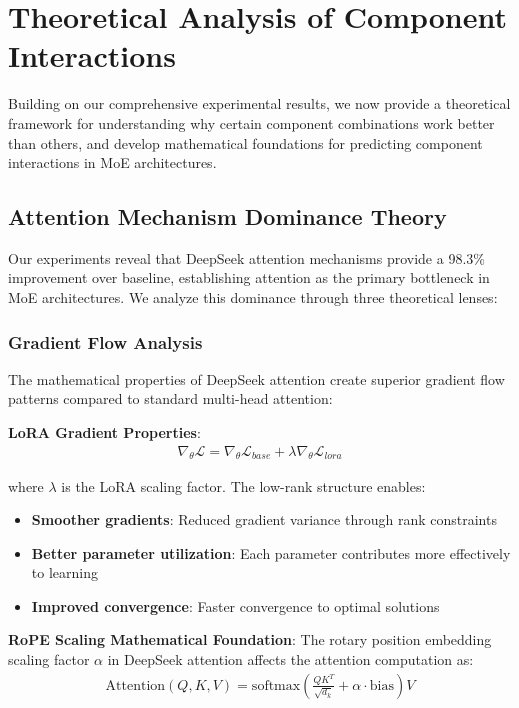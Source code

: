 \documentclass[11pt,a4paper]{article}
\begin{document}
\section{Theoretical Analysis of Component Interactions}

Building on our comprehensive experimental results, we now provide a theoretical framework for understanding why certain component combinations work better than others, and develop mathematical foundations for predicting component interactions in MoE architectures.

\subsection{Attention Mechanism Dominance Theory}

Our experiments reveal that DeepSeek attention mechanisms provide a 98.3\% improvement over baseline, establishing attention as the primary bottleneck in MoE architectures. We analyze this dominance through three theoretical lenses:

\subsubsection{Gradient Flow Analysis}

The mathematical properties of DeepSeek attention create superior gradient flow patterns compared to standard multi-head attention:

\textbf{LoRA Gradient Properties}:
\begin{align}
\nabla_\theta \mathcal{L} = \nabla_\theta \mathcal{L}_{base} + \lambda \nabla_\theta \mathcal{L}_{lora}
\end{align}

where $\lambda$ is the LoRA scaling factor. The low-rank structure enables:
\begin{itemize}
    \item \textbf{Smoother gradients}: Reduced gradient variance through rank constraints
    \item \textbf{Better parameter utilization}: Each parameter contributes more effectively to learning
    \item \textbf{Improved convergence}: Faster convergence to optimal solutions
\end{itemize}

\textbf{RoPE Scaling Mathematical Foundation}:
The rotary position embedding scaling factor $\alpha$ in DeepSeek attention affects the attention computation as:
\begin{align}
\text{Attention}(Q, K, V) = \text{softmax}\left(\frac{QK^T}{\sqrt{d_k}} + \alpha \cdot \text{bias}\right)V
\end{align}
\end{document}
